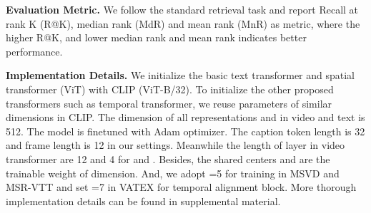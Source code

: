 \documentclass[final]{cvpr}
\begin{document}
\textbf{Evaluation Metric.} We follow the standard retrieval task \cite{miech2018learning,mithun2018learning,zhang2018cross} and report Recall at rank K (R@K), median rank (MdR) and mean rank (MnR) as metric, where the higher R@K, and lower median rank and mean rank indicates better performance.

\textbf{Implementation Details.} 
We initialize the basic text transformer and spatial transformer (ViT) with CLIP (ViT-B/32). 
To initialize the other proposed transformers such as temporal transformer, we reuse parameters of similar dimensions in CLIP.  The dimension of all representations  and  in video and text is 512. The model is finetuned with Adam optimizer. The caption token length is 32 and frame length is 12 in our settings. Meanwhile the length of layer in video transformer are 12 and 4 for  and . Besides, the shared centers  and  are the trainable weight of  dimension. And, we adopt =5 for training in MSVD and MSR-VTT and set =7 in VATEX for temporal alignment block. More thorough implementation details can be found in supplemental material.
\end{document}

